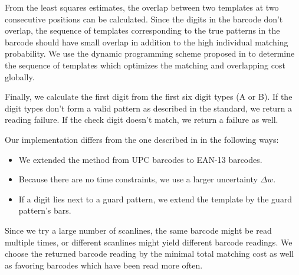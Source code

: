 From the least squares estimates, the overlap between two templates at two
consecutive positions can be calculated.
Since the digits in the barcode don't overlap, the sequence of templates corresponding
to the true patterns in the barcode should have small overlap in addition to the
high individual matching probability. We use the dynamic programming scheme
proposed in \cite{Gallo2011} to determine the sequence of templates which
optimizes the matching and overlapping cost globally.

Finally, we calculate the first digit from the first six digit types (A or B).
If the digit types don't form a valid pattern as described in the standard, we
return a reading failure. If the check digit doesn't match, we return a failure
as well.

Our implementation  differs from the one described in \cite{Gallo2011} in the
following ways:
\begin{itemize}
\item We extended the method from UPC barcodes to EAN-13 barcodes.
\item Because there are no time constraints, we use a larger uncertainty
  $\Delta w$.
\item If a digit lies next to a guard pattern, we extend the template by the
  guard pattern's bars.
\end{itemize}

Since we try a large number of scanlines, the same barcode might be read
multiple times, or different scanlines might yield different barcode readings.
We choose the returned barcode reading by the minimal total matching cost as well as
favoring barcodes which have been read more often.






